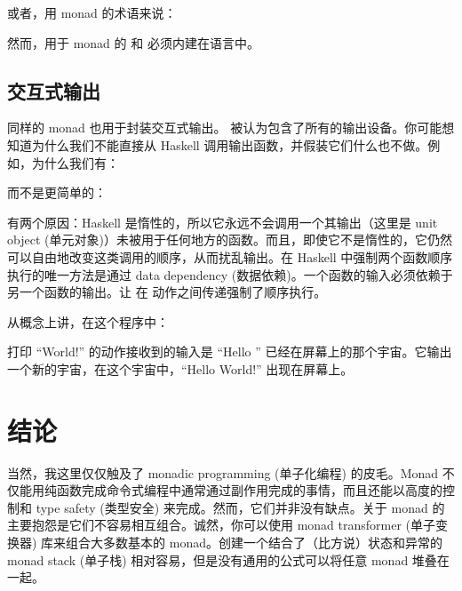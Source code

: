 或者，用  monad 的术语来说：

然而，用于  monad 的 \code{>=>} 和  必须内建在语言中。

\subsection{交互式输出}

同样的  monad 也用于封装交互式输出。 被认为包含了所有的输出设备。你可能想知道为什么我们不能直接从 Haskell 调用输出函数，并假装它们什么也不做。例如，为什么我们有：

而不是更简单的：

有两个原因：Haskell 是惰性的，所以它永远不会调用一个其输出（这里是 unit object (单元对象)）未被用于任何地方的函数。而且，即使它不是惰性的，它仍然可以自由地改变这类调用的顺序，从而扰乱输出。在 Haskell 中强制两个函数顺序执行的唯一方法是通过 data dependency (数据依赖)。一个函数的输入必须依赖于另一个函数的输出。让  在  动作之间传递强制了顺序执行。

从概念上讲，在这个程序中：

打印 “World!” 的动作接收到的输入是 “Hello ” 已经在屏幕上的那个宇宙。它输出一个新的宇宙，在这个宇宙中，“Hello World!” 出现在屏幕上。

\section{结论}

当然，我这里仅仅触及了 monadic programming (单子化编程) 的皮毛。Monad 不仅能用纯函数完成命令式编程中通常通过副作用完成的事情，而且还能以高度的控制和 type safety (类型安全) 来完成。然而，它们并非没有缺点。关于 monad 的主要抱怨是它们不容易相互组合。诚然，你可以使用 monad transformer (单子变换器) 库来组合大多数基本的 monad。创建一个结合了（比方说）状态和异常的 monad stack (单子栈) 相对容易，但是没有通用的公式可以将任意 monad 堆叠在一起。